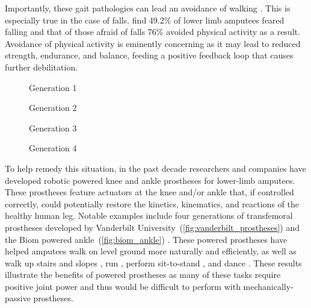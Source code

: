 Importantly, these gait pathologies can lead an avoidance of walking
\citep{gauthier1999enabling}. This is especially true in the case of falls.
\citet{miller2001prevalence} find 49.2\% of lower limb amputees feared falling
and that of those afraid of falls 76\% avoided physical activity as a result.
Avoidance of physical activity is eminently concerning as it may lead to reduced
strength, endurance, and balance, feeding a positive feedback loop that causes
further debilitation.
\begin{figure*}[b]
    \centering
	\begin{subfigure}[b]{0.2\textwidth}
    	\centering
        \caption{Generation 1}
	\end{subfigure}
	\begin{subfigure}[b]{0.2\textwidth}
    	\centering
        \caption{Generation 2}
	\end{subfigure}
	\begin{subfigure}[b]{0.2\textwidth}
    	\centering
        \caption{Generation 3}
	\end{subfigure}
	\begin{subfigure}[b]{0.2\textwidth}
    	\centering
        \caption{Generation 4}
	\end{subfigure}
    \caption{Vanderbilt University's Robotic Transfemoral
    Prostheses.\vspace{0.1in}}
    \label{fig:vanderbilt_prostheses}
\end{figure*}

To help remedy this situation, in the past decade researchers and companies have
developed robotic powered knee and ankle prostheses for lower-limb amputees.
These prostheses feature actuators at the knee and/or ankle that, if controlled
correctly, could potentially restore the kinetics, kinematics, and reactions
of the healthy human leg. Notable examples include four generations of
transfemoral prostheses developed by Vanderbilt
University~(\cref{fig:vanderbilt_prostheses}) \citep{sup2007design,
sup2009preliminary, lawson2013control, lawson2014robotic} and the Biom powered
ankle~(\cref{fig:biom_ankle}) \citep{herr2012bionic}. These powered prostheses
have helped amputees walk on level ground more naturally and efficiently, as
well as walk up stairs and slopes \citep{sup2011upslope, lawson2013control}, run
\citep{huff2012running, shultz2015running}, perform sit-to-stand
\citep{varol2009powered}, and dance \citep{rouse2015design}. These results
illustrate the benefits of powered prostheses as many of these tasks require
positive joint power and thus would be difficult to perform with
mechanically-passive prostheses.

